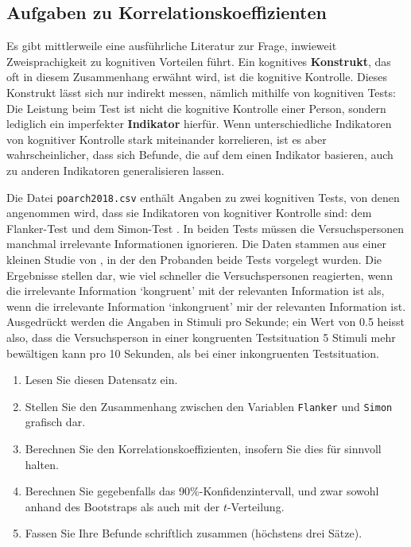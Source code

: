 \documentclass[oneside, 10pt]{book}\usepackage[]{graphicx}\usepackage[]{xcolor}
\begin{document}
\subsection{Aufgaben zu Korrelationskoeffizienten}
  Es gibt mittlerweile
  eine ausführliche Literatur zur Frage, inwieweit Zweisprachigkeit zu kognitiven
  Vorteilen führt. Ein kognitives \textbf{Konstrukt}, das oft in diesem Zusammenhang erwähnt
  wird, ist die kognitive Kontrolle. Dieses Konstrukt lässt sich nur indirekt
  messen, nämlich mithilfe von kognitiven Tests: Die Leistung beim Test ist
  nicht die kognitive Kontrolle einer Person, sondern lediglich ein imperfekter
  \textbf{Indikator} hierfür. Wenn unterschiedliche Indikatoren von kognitiver Kontrolle
  stark miteinander korrelieren, ist es aber wahrscheinlicher, dass sich Befunde,
  die auf dem einen Indikator basieren, auch zu anderen Indikatoren generalisieren lassen.

  Die Datei \texttt{poarch2018.csv} enthält Angaben zu zwei kognitiven Tests,
  von denen angenommen wird, dass sie Indikatoren von kognitiver Kontrolle sind:
  dem Flanker-Test \citep{Eriksen1974} und dem Simon-Test \citep{Simon1969b}.
  In beiden Tests müssen die Versuchspersonen manchmal irrelevante Informationen ignorieren.
  Die Daten stammen aus einer kleinen Studie von \citet{Poarch2018}, in der den
  Probanden beide Tests vorgelegt wurden.
  Die Ergebnisse stellen dar, wie viel schneller die Versuchspersonen reagierten, wenn die
  irrelevante In\-for\-ma\-tion `kongruent' mit der relevanten Information ist als, wenn
  die irrelevante Information `inkongruent' mir der relevanten Information ist.
  Ausgedrückt werden die Angaben in Stimuli pro Sekunde; ein Wert von 0.5 heisst also,
  dass die Versuchsperson in einer kongruenten Testsituation
  5 Stimuli mehr bewältigen kann pro 10 Sekunden,
  als bei einer inkongruenten Testsituation.\label{aufgabe:poarch}

  \begin{enumerate}
  \item Lesen Sie diesen Datensatz ein.
  \item Stellen Sie den Zusammenhang zwischen den Variablen \texttt{Flanker} und \texttt{Simon} grafisch dar.
  \item Berechnen Sie den Korrelationskoeffizienten, insofern Sie dies für sinnvoll halten.
  \item Berechnen Sie gegebenfalls das 90\%-Konfidenzintervall, und zwar sowohl anhand des Bootstraps als auch
      mit der $t$-Verteilung.
  \item Fassen Sie Ihre Befunde schriftlich zusammen (höchstens drei Sätze).
  \end{enumerate}
\end{document}
